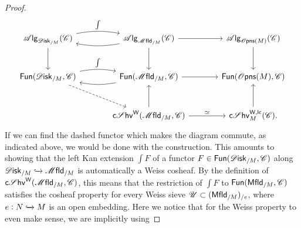\documentclass[../text]{subfiles}
\begin{document}
\begin{proof}
\begin{equation}
\begin{tikzcd}[row sep = large, column sep = large]
            \alg{\disk_{/M}} (\catC) \arrow[r, bend left=10, "\int"] \arrow[d] & \alg{\mfld_{/M}} (\catC) \arrow[l, bend left=10] \arrow[r] \arrow[d] & \alg{\opens(M)} (\catC) \arrow[d] \\
            \mathsf{Fun}(\disk_{/M}, \catC) \arrow[r, bend left=10, "\int"] \arrow[dr, dashed] & \mathsf{Fun}(\mfld_{/M}, \catC) \arrow[l, bend left=10] \arrow[r] & \mathsf{Fun}(\opens(M), \catC) \\
            & \csheaves[W](\mfld_{/M}, \catC) \arrow[r, "\simeq"] \arrow[u] & \csheaves[W, lc]_M(\catC) \arrow[u].
        \end{tikzcd}
    \end{equation}
    If we can find the dashed functor which makes the diagram commute, as indicated above, we would be done with the construction. This amounts to showing that the left Kan extension $\int F$ of a functor $F \in \mathsf{Fun}(\disk_{/M}, \catC)$ along $\disk_{/M} \xhookrightarrow{} \mfld_{/M}$ is automatically a Weiss cosheaf. By the definition of $\csheaves[W](\mfld_{/M}, \catC)$, this means that the restriction of $\int F$ to $\mathsf{Fun}(\mfld[r]_{/M}, \catC)$ satisfies the cosheaf property for every Weiss sieve $\mathscr{U} \subset (\mfld[r]_{/M})_{/e}$, where $e:N \xhookrightarrow{} M$ is an open embedding. Here we notice that for the Weiss property to even make sense, we are implicitly using 
    

\end{proof}
\end{document}
